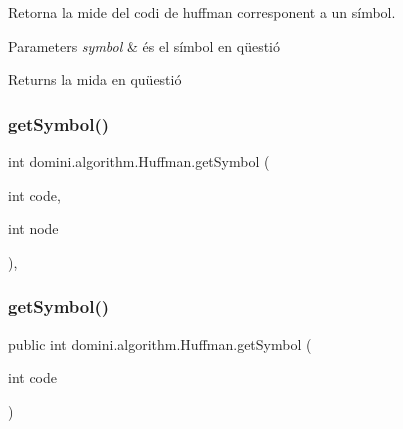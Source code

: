Retorna la mide del codi de huffman corresponent a un símbol. 


\begin{DoxyParams}{Parameters}
{\em symbol} & és el símbol en qüestió \\
\hline
\end{DoxyParams}
\begin{DoxyReturn}{Returns}
la mida en quüestió 
\end{DoxyReturn}
\mbox{\label{classdomini_1_1algorithm_1_1Huffman_ad1dafb062b641d7294fa057c3a7d053e}} 
\subsubsection{\texorpdfstring{get\+Symbol()}{getSymbol()}\hspace{0.1cm}{\footnotesize\ttfamily [1/2]}}
{\footnotesize\ttfamily int domini.\+algorithm.\+Huffman.\+get\+Symbol (\begin{DoxyParamCaption}\item[{int}]{code,  }\item[{int}]{node }\end{DoxyParamCaption})\hspace{0.3cm}{\ttfamily [inline]}, {\ttfamily [private]}}

\mbox{\label{classdomini_1_1algorithm_1_1Huffman_a426cb1d15e2fe89a55e5b0f25e887342}} 
\subsubsection{\texorpdfstring{get\+Symbol()}{getSymbol()}\hspace{0.1cm}{\footnotesize\ttfamily [2/2]}}
{\footnotesize\ttfamily public int domini.\+algorithm.\+Huffman.\+get\+Symbol (\begin{DoxyParamCaption}\item[{int}]{code }\end{DoxyParamCaption})\hspace{0.3cm}{\ttfamily [inline]}}




